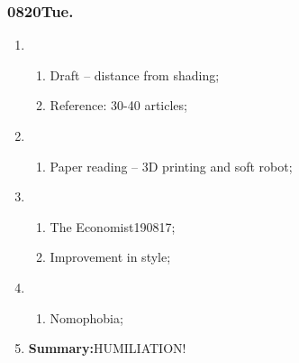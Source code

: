 \subsubsection{0820Tue.}
\begin{enumerate}
	\item \ncquaone
	\begin{enumerate}[(1)]
		\item Draft -- distance from shading;\rightundoneBlack
		\item Reference: 30-40 articles;\rightundoneBlack
	\end{enumerate}
	
	\item \ncquatwo	
	\begin{enumerate}[(1)]
		\item Paper reading -- 3D printing and soft robot;\rightundoneBlack
	\end{enumerate}
	
	\item \ncquathree
	\begin{enumerate}[(1)]
		\item The Economist190817;\rightundoneBlack
		\item Improvement in \LaTeXe style;\rightdone
		
	\end{enumerate}
	
	\item \ncquafour	
	\begin{enumerate}[(1)]
		\item Nomophobia;\rightundoneBlack
	\end{enumerate}
	\item \textbf{Summary:}HUMILIATION! 
\end{enumerate}
